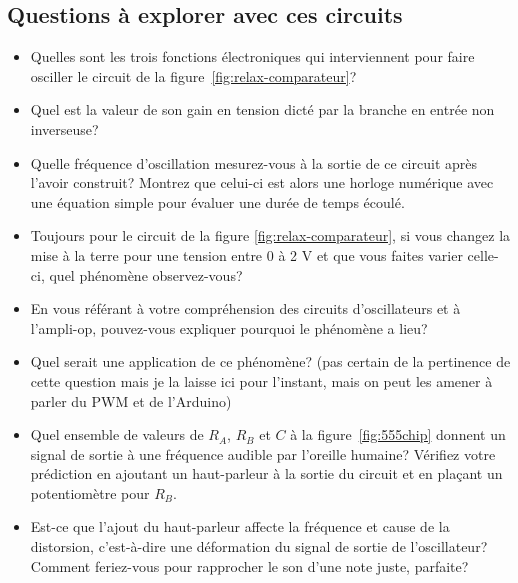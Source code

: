 \documentclass[canadien,12pt,oneside,letterpaper]{article}
\begin{document}
\subsection{Questions à explorer avec ces circuits}
\begin{itemize}
    \item Quelles sont les trois fonctions électroniques qui interviennent pour faire osciller le circuit de la figure~\ref{fig:relax-comparateur}? %
    \item Quel est la valeur de son gain en tension dicté par la branche en entrée non inverseuse?
    \item Quelle fréquence d'oscillation mesurez-vous à la sortie de ce circuit après l'avoir construit? Montrez que celui-ci est alors une horloge numérique avec une équation simple pour évaluer une durée de temps écoulé.
    \item Toujours pour le circuit de la figure \ref{fig:relax-comparateur}, si vous changez la mise à la terre pour une tension entre 0 à 2 V et que vous faites varier celle-ci, quel phénomène observez-vous?
    \item En vous référant à votre compréhension des circuits d'oscillateurs et à l'ampli-op, pouvez-vous expliquer pourquoi le phénomène a lieu?
    \item Quel serait une application de ce phénomène? (pas certain de la pertinence de cette question mais je la laisse ici pour l'instant, mais on peut les amener à parler du PWM et de l'Arduino)
    \item Quel ensemble de valeurs de $R_A$, $R_B$ et $C$ à la figure~\ref{fig:555chip} donnent un signal de sortie à une fréquence audible par l'oreille humaine? Vérifiez votre prédiction en ajoutant un haut-parleur à la sortie du circuit et en plaçant un potentiomètre pour $R_B$. %
    \item  Est-ce que l'ajout du haut-parleur affecte la fréquence et cause de la distorsion, c'est-à-dire une déformation du signal de sortie de l'oscillateur? Comment feriez-vous pour rapprocher le son d'une note juste, parfaite? %
\end{itemize}
\end{document}
